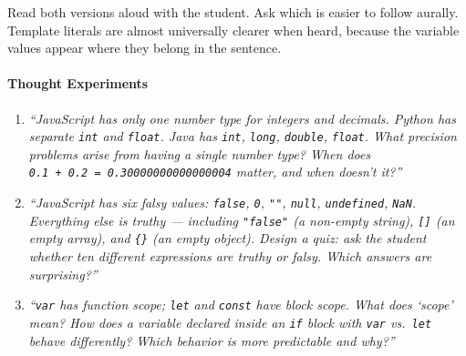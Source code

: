 \documentclass[
  justified,
  openright,
]{tufte-book}
\let\paragraph\paragraph
\newcommand{\BuiltInTok}[1]{#1}
\newcommand{\CommentTok}[1]{\textcolor{MidGray}{#1}}
\newcommand{\DecValTok}[1]{\textcolor{Purple}{#1}}
\newcommand{\FunctionTok}[1]{\textcolor{BrandBlue}{#1}}
\newcommand{\KeywordTok}[1]{\textcolor{BrandBlue}{#1}}
\newcommand{\NormalTok}[1]{#1}
\newcommand{\OperatorTok}[1]{\textcolor{DarkGray}{#1}}
\newcommand{\SpecialCharTok}[1]{\textcolor{Teal}{#1}}
\newcommand{\StringTok}[1]{\textcolor{Teal}{#1}}
\newcommand{\VerbatimStringTok}[1]{\textcolor{Teal}{#1}}
\newenvironment{Shaded}{%
  \begin{snugshade}
}{%
  \end{snugshade}
}
\let\paragraph\paragraph
\begin{document}
\begin{Shaded}
\end{Shaded}

Read both versions aloud with the student. Ask which is easier to follow
aurally. Template literals are almost universally clearer when heard,
because the variable values appear where they belong in the sentence.

\paragraph{Thought Experiments}\label{thought-experiments-1}

\begin{enumerate}
\def\labelenumi{\arabic{enumi}.}
\item
  \emph{``JavaScript has only one number type for integers and decimals.
  Python has separate \texttt{int} and \texttt{float}. Java has
  \texttt{int}, \texttt{long}, \texttt{double}, \texttt{float}. What
  precision problems arise from having a single number type? When does
  \texttt{0.1\ +\ 0.2\ =\ 0.30000000000000004} matter, and when doesn't
  it?''}
\item
  \emph{``JavaScript has six falsy values: \texttt{false}, \texttt{0},
  \texttt{""}, \texttt{null}, \texttt{undefined}, \texttt{NaN}.
  Everything else is truthy --- including \texttt{"false"} (a non-empty
  string), \texttt{{[}{]}} (an empty array), and \texttt{\{\}} (an empty
  object). Design a quiz: ask the student whether ten different
  expressions are truthy or falsy. Which answers are surprising?''}
\item
  \emph{``\texttt{var} has function scope; \texttt{let} and
  \texttt{const} have block scope. What does `scope' mean? How does a
  variable declared inside an \texttt{if} block with \texttt{var}
  vs.~\texttt{let} behave differently? Which behavior is more
  predictable and why?''}
\end{enumerate}
\end{document}
